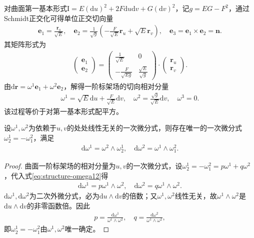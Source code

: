 \documentclass[../../main.tex]{subfiles}%
\begin{document}
对曲面第一基本形式$\mathrm{I}=E(\mathrm{d}u)^2+2F\mathrm{d}u\mathrm{d}v+G(\mathrm{d}v)^2$，记$g=EG-F^2$，通过Schmidt正交化可得单位正交切向量
\begin{align}
\boldsymbol{e}_1=\frac{\boldsymbol{r}_u}{\sqrt{E}},\quad \boldsymbol{e}_2=\frac{1}{\sqrt{g}}\left(-\frac{F}{\sqrt{E}}\boldsymbol{r}_u+\sqrt{E}\boldsymbol{r}_v\right),\quad \boldsymbol{e}_3=\boldsymbol{e}_1\times\boldsymbol{e}_2=\boldsymbol{n}.
\label{eq:schmidt-orth}
\end{align}
其矩阵形式为
\begin{align*}
\begin{pmatrix}\boldsymbol{e}_1\\\boldsymbol{e}_2\end{pmatrix}=\begin{pmatrix}\frac{1}{\sqrt{E}}&0\\-\frac{F}{\sqrt{Eg}}&\frac{\sqrt{E}}{\sqrt{g}}\end{pmatrix}\cdot\begin{pmatrix}\boldsymbol{r}_u\\\boldsymbol{r}_v\end{pmatrix}.
\end{align*}
由$\mathrm{d}\boldsymbol{r}=\omega^1\boldsymbol{e}_1+\omega^2\boldsymbol{e}_2$，解得一阶标架场的切向相对分量
\begin{align}
\omega^1=\sqrt{E}\mathrm{d}u+\frac{F}{\sqrt{E}}\mathrm{d}v,\quad \omega^2=\frac{\sqrt{g}}{\sqrt{E}}\mathrm{d}v,\quad \omega^3=0.
\label{eq:first-order-omega12}
\end{align}
该过程等价于对第一基本形式配平方。

\begin{theorem}
设$\omega^1,\omega^2$为依赖于$u,v$的处处线性无关的一次微分式，则存在唯一的一次微分式$\omega_2^1=-\omega_1^2$，满足
\begin{align}
\mathrm{d}\omega^1=\omega^2\wedge\omega_2^1,\quad \mathrm{d}\omega^2=\omega^1\wedge\omega_1^2.
\label{eq:structure-omega12}
\end{align}
\end{theorem}

\begin{proof}

曲面一阶标架场的相对分量为$u,v$的一次微分式，设$\omega_2^1=-\omega_1^2=p\omega^1+q\omega^2$，代入式\eqref{eq:structure-omega12}得
\begin{align*}
\mathrm{d}\omega^1=p\omega^1\wedge\omega^2,\quad \mathrm{d}\omega^2=q\omega^1\wedge\omega^2.
\end{align*}
$\mathrm{d}\omega^1,\mathrm{d}\omega^2$为二次外微分式，必为$\mathrm{d}u\wedge\mathrm{d}v$的倍数；又$\omega^1,\omega^2$线性无关，故$\omega^1\wedge\omega^2$是$\mathrm{d}u\wedge\mathrm{d}v$的非零函数倍。因此
\begin{align*}
p=\frac{\mathrm{d}\omega^1}{\omega^1\wedge\omega^2},\quad q=\frac{\mathrm{d}\omega^2}{\omega^1\wedge\omega^2},
\end{align*}
即$\omega_2^1=-\omega_1^2$由$\omega^1,\omega^2$唯一确定。

\end{proof}
\end{document}
